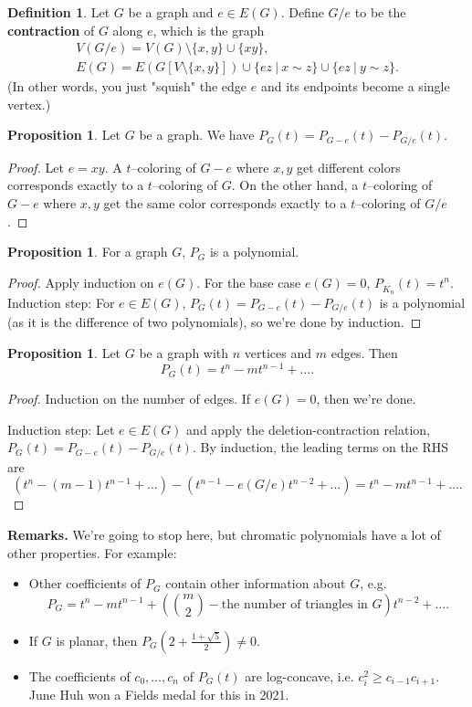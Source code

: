 \documentclass{article}
\theoremstyle{definition}
\newtheorem{prop}[theorem]{Proposition}
\newtheorem{defn}{Definition}[section]
\begin{document}
\begin{defn}
    Let $G$ be a graph and $e \in E(G)$. Define $G/e$ to be the \textbf{contraction} of $G$ along $e$, which is the graph 
    \begin{align*}
        V(G/e) = V(G)\setminus \{x,y\} \cup \{xy\}, \\
        E(G) = E(G[V\setminus \{x,y\}]) \cup \{ez ~|~ x \sim z\} \cup \{ez ~|~ y \sim z\}.
    \end{align*}
    (In other words, you just "squish" the edge $e$ and its endpoints become a single vertex.)
\end{defn}
\begin{prop}
    Let $G$ be a graph. We have $P_G(t) = P_{G-e}(t) - P_{G/e}(t)$.
\end{prop}
\begin{proof}
    Let $e=xy$. A $t$--coloring of $G-e$ where $x,y$ get different colors corresponds exactly to a $t$--coloring of $G$. On the other hand, a $t$--coloring of $G-e$ where $x,y$ get the same color corresponds exactly to a $t$--coloring of $G/e$. 
\end{proof}
\begin{prop}
    For a graph $G$, $P_G$ is a polynomial.
\end{prop}
\begin{proof}
    Apply induction on $e(G)$. For the base case $e(G)=0$, $P_{\overline{K_n}}(t)=t^n$.
    Induction step: For $e \in E(G)$, $P_G(t) = P_{G-e}(t) - P_{G/e}(t)$ is a polynomial (as it is the difference of two polynomials), so we're done by induction.
\end{proof}
\begin{prop}
    Let $G$ be a graph with $n$ vertices and $m$ edges. Then $$P_G(t)=t^n - m t^{n-1} + \ldots.$$
\end{prop}
\begin{proof}
    Induction on the number of edges. If $e(G)=0$, then we're done.
    \vspace{1mm}
    
    Induction step: Let $e \in E(G)$ and apply the deletion-contraction relation,
    $P_G(t)=P_{G-e}(t)- P_{G/e}(t)$. By induction, the leading terms on the RHS are \[
    (t^n - (m-1)t^{n-1} + \ldots) - (t^{n-1} - e(G/e)t^{n-2} + \ldots) = t^n - mt^{n-1} + \ldots .
    \]
\end{proof}
\textbf{Remarks.} We're going to stop here, but chromatic polynomials have a lot of other properties. For example:
\begin{itemize}
    \item Other coefficients of $P_G$ contain other information about $G$, e.g. $$P_G = t^n - mt^{n-1} + \left({{m}\choose{2}} - \text{the number of triangles in }G\right)t^{n-2} + \ldots.$$
    \item If $G$ is planar, then $P_G(2 + \frac{1+\sqrt{5}}{2}) \neq 0$.
    \item The coefficients of $c_0,\ldots,c_n$ of $P_G(t)$ are log-concave, i.e. $c_i^2 \ge c_{i-1}c_{i+1}$. June Huh won a Fields medal for this in 2021.
\end{itemize}
\end{document}
